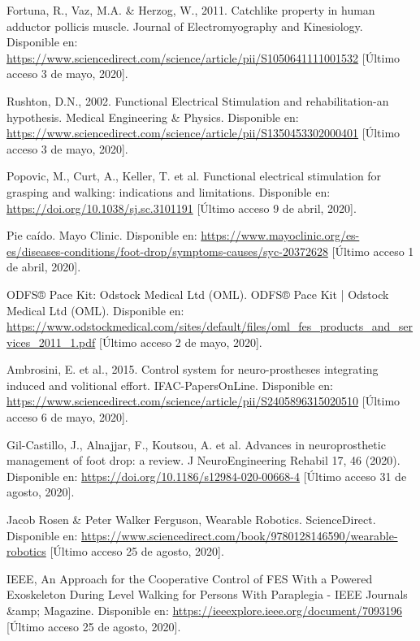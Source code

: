 \begin{thebibliography}{99}
 Fortuna, R., Vaz, M.A. \& Herzog, W., 2011. Catchlike property in human adductor pollicis muscle. Journal of Electromyography and Kinesiology.  Disponible en: \url{https://www.sciencedirect.com/science/article/pii/S1050641111001532} [Último acceso 3 de mayo, 2020].

 Rushton, D.N., 2002. Functional Electrical Stimulation and rehabilitation-an hypothesis. Medical Engineering \& Physics. Disponible en: \url{https://www.sciencedirect.com/science/article/pii/S1350453302000401} [Último acceso 3 de mayo, 2020].

 Popovic, M., Curt, A., Keller, T. et al. Functional electrical stimulation for grasping and walking: indications and limitations. Disponible en: \url{https://doi.org/10.1038/sj.sc.3101191} [Último acceso 9 de abril, 2020].

 Pie caído. Mayo Clinic. Disponible en: \url{https://www.mayoclinic.org/es-es/diseases-conditions/foot-drop/symptoms-causes/syc-20372628} [Último acceso 1 de abril, 2020].

 ODFS® Pace Kit: Odstock Medical Ltd (OML). ODFS® Pace Kit | Odstock Medical Ltd (OML). Disponible en: \url{https://www.odstockmedical.com/sites/default/files/oml_fes_products_and_services_2011_1.pdf} [Último acceso 2 de mayo, 2020].

 Ambrosini, E. et al., 2015. Control system for neuro-prostheses integrating induced and volitional effort. IFAC-PapersOnLine. Disponible en: \url{https://www.sciencedirect.com/science/article/pii/S2405896315020510} [Último acceso 6 de mayo, 2020].

 Gil-Castillo, J., Alnajjar, F., Koutsou, A. et al. Advances in neuroprosthetic management of foot drop: a review. J NeuroEngineering Rehabil 17, 46 (2020). Disponible en: \url{https://doi.org/10.1186/s12984-020-00668-4} [Último acceso 31 de agosto, 2020].

 Jacob Rosen \& Peter Walker Ferguson, Wearable Robotics. ScienceDirect. Disponible en: \url{https://www.sciencedirect.com/book/9780128146590/wearable-robotics} [Último acceso 25 de agosto, 2020].

 IEEE, An Approach for the Cooperative Control of FES With a Powered Exoskeleton During Level Walking for Persons With Paraplegia - IEEE Journals \&amp; Magazine. Disponible en: \url{https://ieeexplore.ieee.org/document/7093196} [Último acceso 25 de agosto, 2020].


\end{thebibliography}
